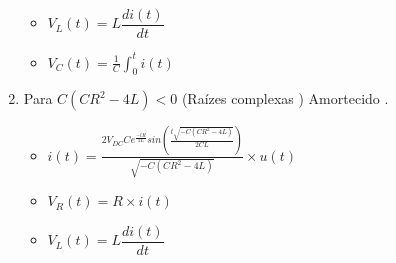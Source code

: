 \begin{enumerate}
\begin{itemize}
\item
$V_L(t)=L\dfrac{di(t)}{dt}$\par
%
\begin{minipage}{0.95\linewidth}
\end{minipage}\par
%
\item
$V_C(t)=\frac{1}{C}\int_0^ti(t)$\par
\begin{minipage}{0.95\linewidth}
\end{minipage}\par
%
\end{itemize}
\item
Para \quad $C(C R^2-4 L)<0$ \quad (Ra\'{i}zes  complexas ) \quad Amortecido .\par
%
\begin{itemize}
\item
$i(t)=\frac{2 V_{DC} C e^{\frac{-tR}{2L}} sin \left( \frac{t \sqrt{-C(CR^2-4L)}}{2CL} \right)}{\sqrt{-C(CR^2-4L)}}\times u(t)$\par
\item
$V_R(t)=R\times i(t)$\par
\item
$V_L(t)=L\dfrac{di(t)}{dt}$\par
%
\begin{minipage}{0.95\linewidth}
\end{minipage}\par

\end{itemize}
\end{enumerate}
